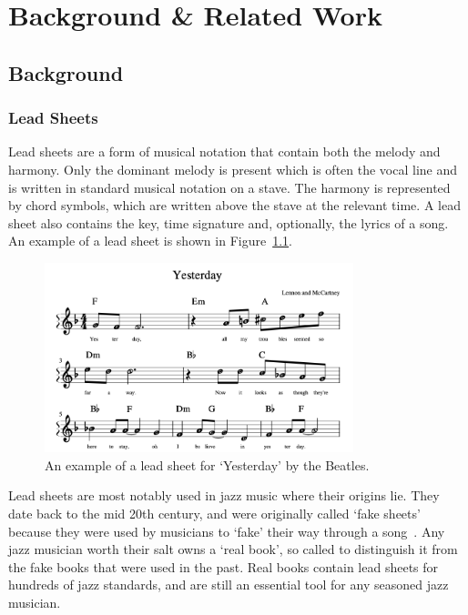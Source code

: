 \chapter{Background \& Related Work}

\section{Background}

\subsection{Lead Sheets}

Lead sheets are a form of musical notation that contain both the melody and harmony. Only the dominant melody is present which is often the vocal line and is written in standard musical notation on a stave. The harmony is represented by chord symbols, which are written above the stave at the relevant time. A lead sheet also contains the key, time signature and, optionally, the lyrics of a song. An example of a lead sheet is shown in Figure~\ref{fig:lead_sheet_example}.


\begin{figure}[h]
    \centering
    \includegraphics[width=0.8\textwidth]{images/lead_sheet_example.png}
    \caption{An example of a lead sheet for `Yesterday' by the Beatles.}
    \label{fig:lead_sheet_example}
\end{figure}

Lead sheets are most notably used in jazz music where their origins lie. They date back to the mid 20th century, and were originally called `fake sheets' because they were used by musicians to `fake' their way through a song~\citep{RealBookPodcast}. Any jazz musician worth their salt owns a `real book', so called to distinguish it from the fake books that were used in the past. Real books contain lead sheets for hundreds of jazz standards, and are still an essential tool for any seasoned jazz musician. 

